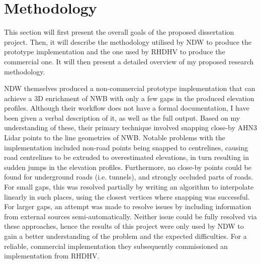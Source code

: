 
\chapter{Methodology}
\label{chap:m}

This section will first present the overall goals of the proposed dissertation project. Then, it will describe the methodology utilised by NDW to produce the prototype implementation and the one used by RHDHV to produce the commercial one. It will then present a detailed overview of my proposed research methodology.

NDW themselves produced a non-commercial prototype implementation that can achieve a 3D enrichment of NWB with only a few gaps in the produced elevation profiles. Although their workflow does not have a formal documentation, I have been given a verbal description of it, as well as the full output. Based on my understanding of these, their primary technique involved snapping close-by AHN3 Lidar points to the line geometries of NWB. Notable problems with the implementation included non-road points being snapped to centrelines, causing road centrelines to be extruded to overestimated elevations, in turn resulting in sudden jumps in the elevation profiles. Furthermore, no close-by points could be found for underground roads (i.e. tunnels), and strongly occluded parts of roads. For small gaps, this was resolved partially by writing an algorithm to interpolate linearly in such places, using the closest vertices where snapping was successful. For larger gaps, an attempt was made to resolve issues by including information from external sources semi-automatically. Neither issue could be fully resolved via these approaches, hence the results of this project were only used by NDW to gain a better understanding of the problem and the expected difficulties. For a reliable, commercial implementation they subsequently commissioned an implementation from RHDHV.

